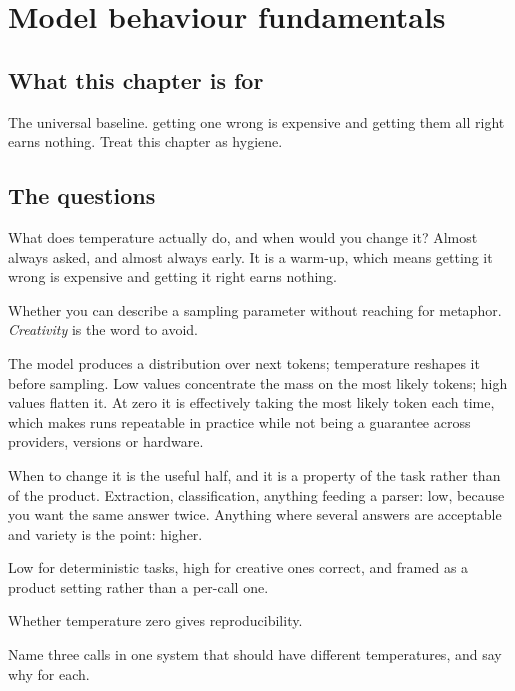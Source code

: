 \chapter{Model behaviour fundamentals}
\label{ch:model}

\section*{What this chapter is for}

The universal baseline.  \dash{} getting one wrong is
expensive and getting them all right earns nothing. Treat this chapter as
hygiene.

\section*{The questions}

\begin{bankq}{What does temperature actually do, and when would you change it?}
\qasked
Almost always asked, and almost always early. It is a warm-up, which means
getting it wrong is expensive and getting it right earns nothing.

\qtested
Whether you can describe a sampling parameter without reaching for
metaphor. \emph{Creativity} is the word to avoid.

\qstaff
The model produces a distribution over next tokens; temperature reshapes it
before sampling. Low values concentrate the mass on the most likely tokens;
high values flatten it. At zero it is effectively taking the most likely token
each time, which makes runs repeatable in practice while not being a guarantee
across providers, versions or hardware.

When to change it is the useful half, and it is a property of the task rather
than of the product. Extraction, classification, anything feeding a parser:
low, because you want the same answer twice. Anything where several answers
are acceptable and variety is the point: higher. 

\qsenior
Low for deterministic tasks, high for creative ones \dash{} correct, and framed
as a product setting rather than a per-call one.

\qcontested
Whether temperature zero gives reproducibility. 

\qdrill
Name three calls in one system that should have different temperatures, and
say why for each.
\end{bankq}

